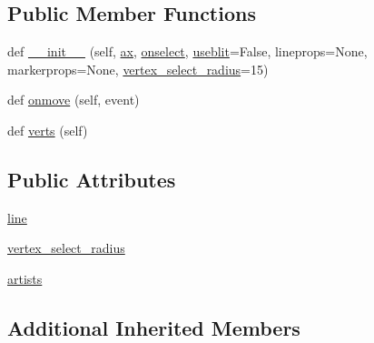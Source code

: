 \subsection*{Public Member Functions}
\begin{DoxyCompactItemize}
\item 
def \hyperlink{classmatplotlib_1_1widgets_1_1PolygonSelector_a7249877a7cdf72467696eb9e3f82fc96}{\+\_\+\+\_\+init\+\_\+\+\_\+} (self, \hyperlink{classmatplotlib_1_1widgets_1_1AxesWidget_ac0722858b7001d10a42055dc90420b4f}{ax}, \hyperlink{classmatplotlib_1_1widgets_1_1__SelectorWidget_ad893af1ad010d595c7cce1106b48d854}{onselect}, \hyperlink{classmatplotlib_1_1widgets_1_1__SelectorWidget_a6d178ef2dd7ec61c11b18302de3f43bf}{useblit}=False, lineprops=None, markerprops=None, \hyperlink{classmatplotlib_1_1widgets_1_1PolygonSelector_afd99cff1d93a27df668a2d86178f4519}{vertex\+\_\+select\+\_\+radius}=15)
\item 
def \hyperlink{classmatplotlib_1_1widgets_1_1PolygonSelector_a8fa486d641d53e2f8d4cd42058d63da4}{onmove} (self, event)
\item 
def \hyperlink{classmatplotlib_1_1widgets_1_1PolygonSelector_a16b522342c41e88284774df6eddc7820}{verts} (self)
\end{DoxyCompactItemize}
\subsection*{Public Attributes}
\begin{DoxyCompactItemize}
\item 
\hyperlink{classmatplotlib_1_1widgets_1_1PolygonSelector_afd85181a50784842331747cc6af4d080}{line}
\item 
\hyperlink{classmatplotlib_1_1widgets_1_1PolygonSelector_afd99cff1d93a27df668a2d86178f4519}{vertex\+\_\+select\+\_\+radius}
\item 
\hyperlink{classmatplotlib_1_1widgets_1_1PolygonSelector_ab6e8bb70d3122fd8bcf15dffbef001cb}{artists}
\end{DoxyCompactItemize}
\subsection*{Additional Inherited Members}


